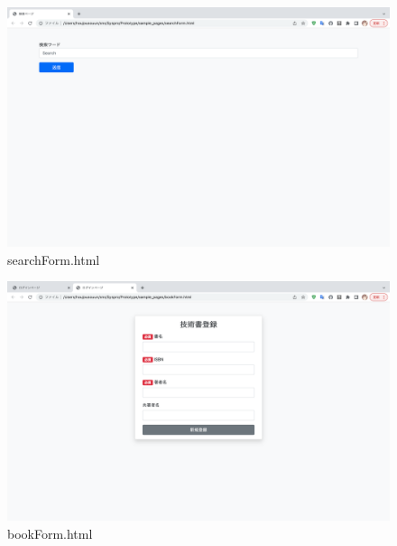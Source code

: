 \documentclass[dvipdfmx]{jsarticle}
\begin{document}
    \begin{figure}[H]
        \begin{center}
            \caption*{searchForm.html}
            \includegraphics[scale=0.3,clip]{pictures/searchForm.png}
        \end{center}
    \end{figure}

    \begin{figure}[H]
        \begin{center}
            \caption*{bookForm.html}
            \includegraphics[scale=0.3,clip]{pictures/bookForm.png}
        \end{center}
    \end{figure}
\end{document}
